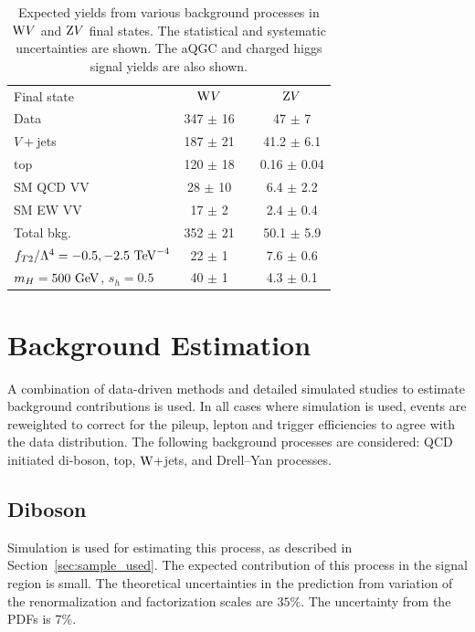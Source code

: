 \begin{table}[!htbp]
  \begin{center}
  \begin{tabular} {lccc}
  \hline
  \hline
  Final state 	& $\mathrm{W} V$ &	& $\mathrm{Z} V$ 	\\
  \cline{2-2} \cline{4-4}
  Data 	& 347 $\pm$ 16 && 47 $\pm$ 7 \\
  \hline
  $V+$jets    	      &   187 $\pm$ 21  &&    41.2 $\pm$ 6.1    \\
  top       	      &   120 $\pm$  18  &&    0.16 $\pm$  0.04    \\
  SM QCD VV  	      &   28 $\pm$  10  &&    6.4 $\pm$  2.2      \\
  SM EW VV  	      &   17 $\pm$  2  &&    2.4 $\pm$  0.4      \\
  \hline
  Total bkg.            &   352 $\pm$  21   &&    50.1 $\pm$  5.9   \\[1ex]
  $f_{T2}/ \Lambda^{4} = -0.5,-2.5~\mathrm{TeV}^{-4}$    &   22 $\pm$ 1 && 7.6 $\pm$ 0.6\\
  $m_{H}=500~\mathrm{GeV}$, $s_{h}=0.5$      &   40 $\pm$ 1 && 4.3 $\pm$ 0.1\\
  \hline
  \end{tabular}
\caption{Expected yields from various background processes in $\mathrm{W} V$ and $\mathrm{Z} V$ final states. The statistical and systematic uncertainties are shown. The aQGC and charged higgs signal yields are also shown.}
\label{tab:sel_yields15}
  \end{center}
\end{table}


\section{Background Estimation} %
\label{sec:background_estimation}
A combination of data-driven methods and detailed simulated studies to 
estimate background contributions is used. In all cases where simulation is used, events are reweighted to correct for the pileup, lepton and trigger efficiencies to agree with the data distribution. The following background processes are considered: QCD initiated di-boson, top, $\mathrm{W}+$jets, and Drell--Yan processes. 

\subsection{Diboson}
Simulation is used for estimating this process, as described in Section~\ref{sec:sample_used}. The expected contribution of this process in the signal region is small. The theoretical uncertainties in the prediction from variation of the renormalization and factorization scales are $35\%$. The uncertainty from the PDFs is $7\%$.

